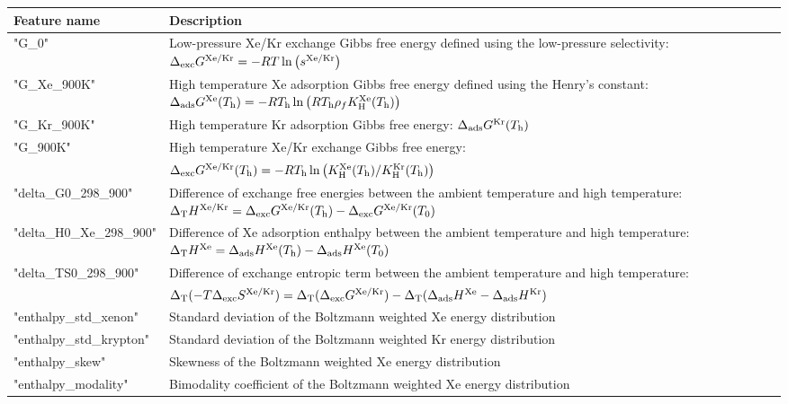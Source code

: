 \documentclass[main]{subfiles}
\begin{document}
\clearpage

  \begin{table}[ht]
  \centering
  \begin{tabular}{|l|m{13cm}|}
  \hline
   {Feature name} &  {Description} \\
  \hline
  "G\_0"  & Low-pressure Xe/Kr exchange Gibbs free energy defined using the low-pressure selectivity: $\Delta_{\text{exc}} G^{\text{Xe/Kr}} = -RT\ln{\left(s\ensuremath{^{\text{Xe/Kr}}}\right)}$ \\
  \hline
  "G\_Xe\_900K"  & High temperature Xe adsorption Gibbs free energy defined using the Henry's constant: $\Delta_{\text{ads}} G^{\text{Xe}} (T_{\text{h}}) = -RT_{\text{h}}\ln{\left(RT\ensuremath{_{\text{h}}}\rho_fK\ensuremath{_{\text{H}}}\ensuremath{^{\text{Xe}}}(T\ensuremath{_{\text{h}}})\right)}$ \\
  \hline
  "G\_Kr\_900K"  & High temperature Kr adsorption Gibbs free energy: $\Delta_{\text{ads}} G^{\text{Kr}} (T_{\text{h}})$ \\
  \hline
  "G\_900K"  & High temperature Xe/Kr exchange Gibbs free energy: \\
    & $\Delta_{\text{exc}} G^{\text{Xe/Kr}} (T_{\text{h}}) = -RT_{\text{h}}\ln{\left(K\ensuremath{_{\text{H}}}\ensuremath{^{\text{Xe}}}(T\ensuremath{_{\text{h}}})/K\ensuremath{_{\text{H}}}\ensuremath{^{\text{Kr}}}(T\ensuremath{_{\text{h}}})\right)}$ \\
  \hline
  "delta\_G0\_298\_900"  & Difference of exchange free energies between the ambient temperature and high temperature: $\Delta_{\text{T}} H^{\text{Xe/Kr}} = \Delta_{\text{exc}} G^{\text{Xe/Kr}} (T_{\text{h}})-\Delta_{\text{exc}} G^{\text{Xe/Kr}} (T_{\text{0}})$ \\
  \hline
  "delta\_H0\_Xe\_298\_900"  & Difference of Xe adsorption enthalpy between the ambient temperature and high temperature: $\Delta_{\text{T}} H^{\text{Xe}} = \Delta_{\text{ads}} H^{\text{Xe}} (T_{\text{h}})-\Delta_{\text{ads}} H^{\text{Xe}} (T_{\text{0}})$ \\
  \hline
  "delta\_TS0\_298\_900"  & Difference of exchange entropic term between the ambient temperature and high temperature: \\
    & $\Delta_{\text{T}} (-T\Delta_{\text{exc}}S^{\text{Xe/Kr}}) = \Delta_{\text{T}} (\Delta_{\text{exc}}G^{\text{Xe/Kr}}) - \Delta_{\text{T}}( \Delta_{\text{ads}}H^{\text{Xe}} - \Delta_{\text{ads}}H^{\text{Kr}})$ \\
  \hline
  "enthalpy\_std\_xenon"  & Standard deviation of the Boltzmann weighted Xe energy distribution \\
  \hline
  "enthalpy\_std\_krypton"  & Standard deviation of the Boltzmann weighted Kr energy distribution \\
  \hline
  "enthalpy\_skew"  & Skewness of the Boltzmann weighted Xe energy distribution \\
  \hline
  "enthalpy\_modality"  & Bimodality coefficient of the Boltzmann weighted Xe energy distribution \\

\end{tabular}
\end{table}
\end{document}
